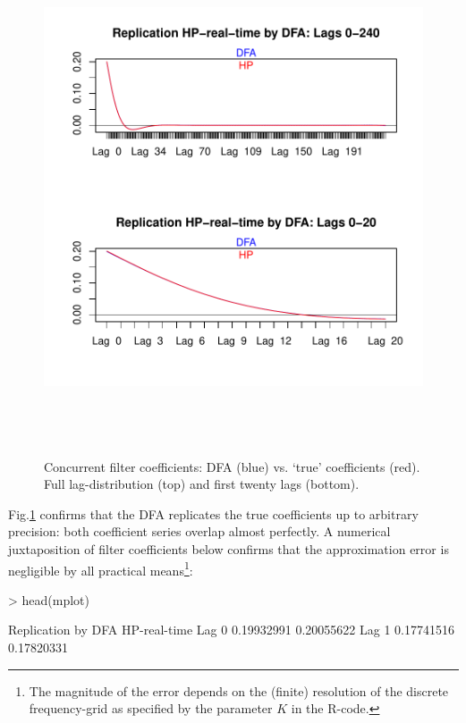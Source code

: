 \documentclass[a4paper]{book}
\begin{document}
\begin{enumerate}
\begin{figure}[H]\begin{center}\includegraphics[height=6in, width=6in]{z_HP_filt_coef}\caption{Concurrent filter coefficients: DFA (blue) vs. `true' coefficients (red). Full lag-distribution (top) and first twenty lags (bottom).\label{z_HP_filt_coef}}\end{center}\end{figure}Fig.\ref{z_HP_filt_coef} confirms that the DFA replicates the true coefficients up to arbitrary precision: both coefficient series overlap almost perfectly. A numerical juxtaposition of filter coefficients below confirms that the approximation error is negligible by all practical means\footnote{The magnitude of the error depends on the (finite) resolution of the discrete frequency-grid as specified by the parameter $K$ in the R-code.}:
\begin{Schunk}
\begin{Sinput}
> head(mplot)
\end{Sinput}
\begin{Soutput}
       Replication by DFA HP-real-time
Lag  0         0.19932991   0.20055622
Lag  1         0.17741516   0.17820331

\end{Soutput}
\end{Schunk}
\end{enumerate}
\end{document}
